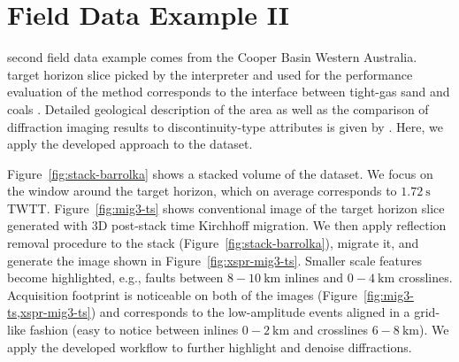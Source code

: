 \section{Field Data Example II}

 second field data example comes from the Cooper Basin  Western Australia.
 target horizon slice picked by the interpreter and used
for the performance evaluation of the method corresponds to the interface between tight-gas sand and coals \cite[]{tyiasning2016comparison}.
Detailed geological description of the area as well as the comparison of diffraction imaging results to discontinuity-type attributes is given by
.
Here, we apply the developed approach to the dataset.

Figure~\ref{fig:stack-barrolka} shows a stacked volume of the dataset. We focus on the window around the target horizon, which on average corresponds to $1.72\ \text{s}$ TWTT.
Figure~\ref{fig:mig3-ts} shows conventional image of the target horizon slice generated with 3D post-stack time Kirchhoff migration.
We then apply reflection removal
procedure to the stack (Figure~\ref{fig:stack-barrolka}), migrate it, and generate the image shown in Figure~\ref{fig:xspr-mig3-ts}. Smaller scale features become highlighted, e.g., 
faults between $8-10\ \text{km}$ inlines and $0-4\ \text{km}$ crosslines. Acquisition footprint is noticeable on both of the images (Figure~\ref{fig:mig3-ts,xspr-mig3-ts}) and corresponds
to the low-amplitude events aligned in a grid-like fashion (easy to notice between inlines $0-2\ \text{km}$ and crosslines $6-8\ \text{km}$).
We apply the developed workflow to further highlight and denoise diffractions.


